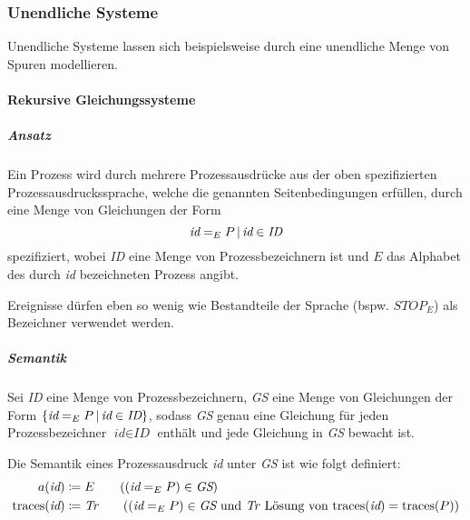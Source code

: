 			\subsubsection{Unendliche Systeme}
				Unendliche Systeme lassen sich beispielsweise durch eine unendliche Menge von Spuren modellieren.

				\paragraph{Rekursive Gleichungssysteme}
					\subparagraph{Ansatz}
						Ein Prozess wird durch mehrere Prozessausdrücke aus der oben spezifizierten Prozessausdruckssprache, welche die genannten Seitenbedingungen erfüllen, durch eine Menge von Gleichungen der Form \[ \textit{id} = _ E P \,\vert\, \textit{id} \in \textit{ID} \] spezifiziert, wobei \textit{ID} eine Menge von Prozessbezeichnern ist und $ E $  das Alphabet des durch \textit{id} bezeichneten Prozess angibt.

						Ereignisse dürfen eben so wenig wie Bestandteile der Sprache (bspw. $ \textit{STOP} _ E $) als Bezeichner verwendet werden.



					\subparagraph{Semantik}
						Sei \textit{ID} eine Menge von Prozessbezeichnern, \textit{GS} eine Menge von Gleichungen der Form $ \{ \textit{id} = _ E P \,\vert\, \textit{id} \in \textit{ID} \} $, sodass \textit{GS} genau eine Gleichung für jeden Prozessbezeichner $ \textit{id} \in \textit{ID} $ enthält und jede Gleichung in \textit{GS} bewacht ist.

						Die Semantik eines Prozessausdruck \textit{id} unter \textit{GS} ist wie folgt definiert:
						\begin{align*}
							a(\textit{id})             & \coloneqq E \tag{$ (\textit{id} = _ E P) \in \textit{GS} $}                                                                                        \\
							\text{traces}(\textit{id}) & \coloneqq \textit{Tr} \tag{$ (\textit{id} = _ E P) \in \textit{GS} $ und \textit{Tr} Lösung von $ \text{traces}(\textit{id}) = \text{traces}(P) $} \\
						\end{align*}

